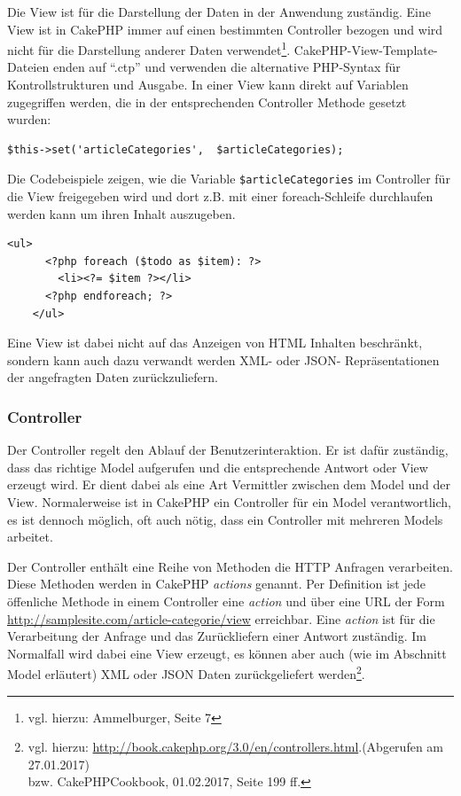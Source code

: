 	Die View ist für die Darstellung der Daten in der Anwendung zuständig. Eine View ist in CakePHP immer auf einen bestimmten Controller bezogen und wird nicht für die Darstellung anderer Daten verwendet\footnote{vgl. hierzu: Ammelburger, Seite 7}. CakePHP-View-Template-Dateien enden auf \enquote{.ctp} und verwenden die alternative PHP-Syntax für Kontrollstrukturen und Ausgabe. 
	In einer View kann direkt auf Variablen zugegriffen werden, die in der entsprechenden Controller Methode gesetzt wurden:\\ 
   \lstset{language=PHP} 
	\begin{lstlisting}[caption={Freigabe einer Controllervariablen für die View}] 
	$this->set('articleCategories',  $articleCategories);
	\end{lstlisting}
	  Die Codebeispiele zeigen, wie die Variable \texttt{\$articleCategories} im Controller für die View freigegeben wird und dort z.B. mit einer foreach-Schleife durchlaufen werden kann um ihren Inhalt auszugeben. 
		\lstset{language=PHP}
		\begin{lstlisting}[caption={Alternative PHP Syntax}] 	
	<ul>
	  <?php foreach ($todo as $item): ?>
	    <li><?= $item ?></li>
	  <?php endforeach; ?>
	</ul>
		\end{lstlisting}
	 Eine View ist dabei nicht auf das Anzeigen von HTML Inhalten beschränkt, sondern kann auch dazu verwandt werden XML- oder JSON- Repräsentationen der angefragten Daten zurückzuliefern.
	\subsubsection{Controller}
	Der Controller regelt den Ablauf der Benutzerinteraktion.
	Er ist dafür zuständig, dass das richtige Model aufgerufen und die entsprechende Antwort oder View erzeugt wird. Er dient dabei als eine Art Vermittler zwischen dem Model und der View. Normalerweise ist in CakePHP ein Controller für ein Model verantwortlich, es ist dennoch möglich, oft auch nötig, dass ein Controller mit mehreren Models arbeitet.
	
	Der Controller enthält eine Reihe von  Methoden die HTTP Anfragen verarbeiten. Diese Methoden werden in CakePHP \textit{actions} genannt. Per Definition ist jede öffenliche Methode in einem Controller eine \textit{action} und über eine URL der Form \url{http://samplesite.com/article-categorie/view} erreichbar.
	Eine \textit{action} ist für die Verarbeitung der Anfrage und das Zurückliefern einer Antwort zuständig. Im Normalfall wird dabei eine View erzeugt, es können aber auch (wie im Abschnitt Model erläutert) XML oder JSON Daten zurückgeliefert werden\footnote{vgl. hierzu: \url{http://book.cakephp.org/3.0/en/controllers.html}.(Abgerufen am 27.01.2017) \\bzw. CakePHPCookbook, 01.02.2017, Seite 199 ff.}.
	 
